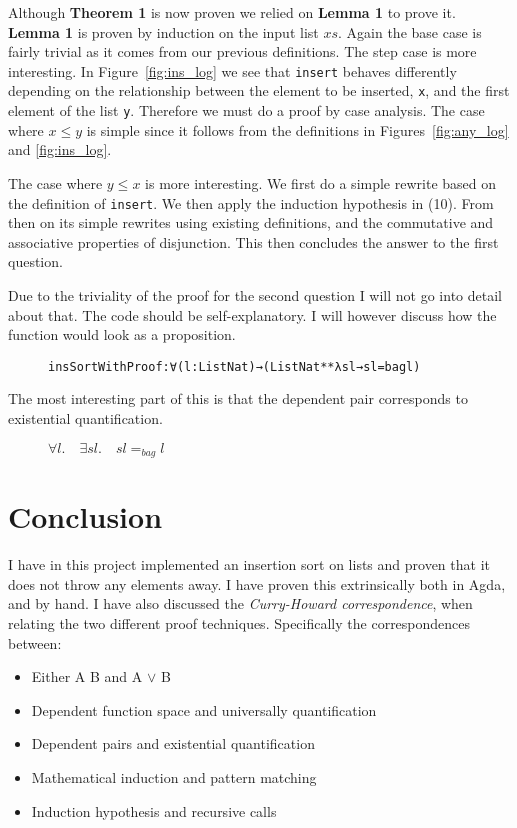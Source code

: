 \documentclass[oribibl, fleqn]{llncs}
\begin{document}
Although \textbf{Theorem 1} is now proven we relied on \textbf{Lemma 1} to prove it. \textbf{Lemma 1} is proven by induction on the input list $xs$. Again the base case is fairly trivial as it comes from our previous definitions. The step case is more interesting. In Figure~\ref{fig:ins_log} we see that \texttt{insert} behaves differently depending on the relationship between the element to be inserted, \texttt{x}, and the first element of the list \texttt{y}. Therefore we must do a proof by case analysis. The case where $x\leq y$ is simple since it follows from the definitions in Figures~\ref{fig:any_log} and \ref{fig:ins_log}.

The case where $y\leq x$ is more interesting. We first do a simple rewrite based on the definition of \texttt{insert}. We then apply the induction hypothesis in (10). From then on its simple rewrites using existing definitions, and the commutative and associative properties of disjunction. This then concludes the answer to the first question.

Due to the triviality of the proof for the second question I will not go into detail about that. The code should be self-explanatory. I will however discuss how the function would look as a proposition.

\begin{figure}
\begin{alltt}
insSortWithProof : ∀ (l : List Nat) → (List Nat ** λ sl → sl =bag l)
\end{alltt}
\label{fig:last_proof_agda}
\end{figure}

The most interesting part of this is that the dependent pair corresponds to existential quantification.

\begin{figure}
\centerline{
$\forall l.\quad\exists sl.\quad sl =_{bag} l$
}
\label{fig:last_proof_prop}
\end{figure}

\section{Conclusion}
I have in this project implemented an insertion sort on lists and proven that it does not throw any elements away. I have proven this extrinsically both in Agda, and by hand. I have also discussed the \emph{Curry-Howard correspondence}, when relating the two different proof techniques. Specifically the correspondences between:
\begin{itemize}
 \item Either A B and A $\vee$ B
 \item Dependent function space and universally quantification
 \item Dependent pairs and existential quantification
 \item Mathematical induction and pattern matching
 \item Induction hypothesis and recursive calls
\end{itemize}

\end{document}
